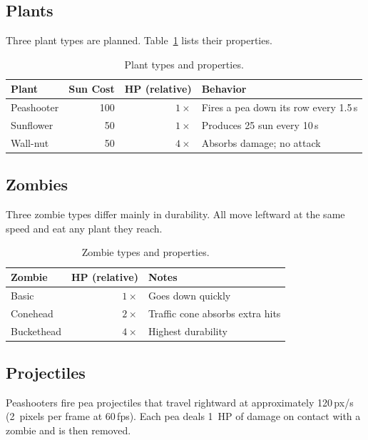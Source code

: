 \documentclass[11pt,letterpaper]{article}
\begin{document}
\subsection{Plants}

Three plant types are planned. Table~\ref{tab:plants} lists their
properties.

\begin{table}[H]
\centering
\caption{Plant types and properties.}
\label{tab:plants}
\begin{tabular}{l r r l}
\toprule
\textbf{Plant} & \textbf{Sun Cost} & \textbf{HP (relative)} & \textbf{Behavior} \\
\midrule
Peashooter & 100 & $1\times$  & Fires a pea down its row every 1.5\,s \\
Sunflower  &  50 & $1\times$  & Produces 25 sun every 10\,s \\
Wall-nut   &  50 & $4\times$  & Absorbs damage; no attack \\
\bottomrule
\end{tabular}
\end{table}

\subsection{Zombies}

Three zombie types differ mainly in durability. All move leftward at the
same speed and eat any plant they reach.

\begin{table}[H]
\centering
\caption{Zombie types and properties.}
\label{tab:zombies}
\begin{tabular}{l r l}
\toprule
\textbf{Zombie} & \textbf{HP (relative)} & \textbf{Notes} \\
\midrule
Basic      & $1\times$  & Goes down quickly \\
Conehead   & $2\times$  & Traffic cone absorbs extra hits \\
Buckethead & $4\times$  & Highest durability \\
\bottomrule
\end{tabular}
\end{table}

\subsection{Projectiles}

Peashooters fire pea projectiles that travel rightward at approximately
120\,px/s (2~pixels per frame at 60\,fps). Each pea deals 1~HP of
damage on contact with a zombie and is then removed.
\end{document}
